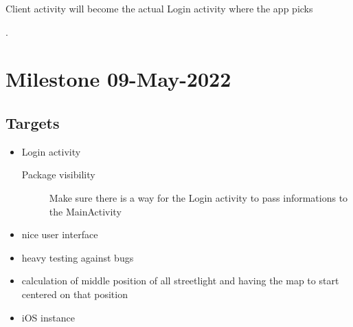 \documentclass[a4paper,12pt]{book}
\begin{document}
Client activity will become the actual Login activity where the app picks

\clearpage
. 
\bigskip
\bigskip
\bigskip
\bigskip
\bigskip
\bigskip
\bigskip
\bigskip
\bigskip
\bigskip
\bigskip
\bigskip
\bigskip
\bigskip
\bigskip
\medskip
\medskip
\medskip
\section{\scalebox{1.5}Milestone 09-May-2022}




\subsection{Targets}

\begin{itemize}
\item{Login activity}
   \begin{description}
   \item[]{}
   \item[Package visibility]{Make sure there is a way for the Login activity to pass informations to the MainActivity}
   \end{description}
\item{nice user interface}
\item{heavy testing against bugs}
\item{calculation of middle position of all streetlight and having the map to start centered on that position}
\item{iOS instance}
\end{itemize}
\end{document}

